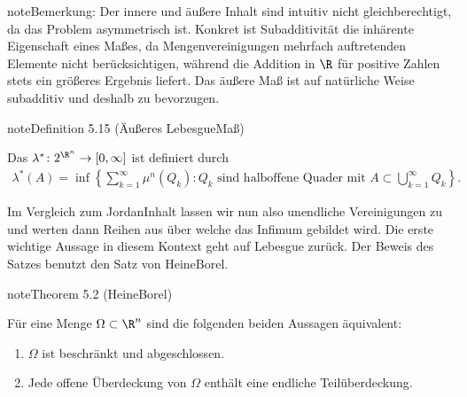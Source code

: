 \documentclass[letterpaper,10pt,german]{jupyterBook}
\begin{document}
\begin{sphinxadmonition}{note}{Bemerkung:}
\sphinxAtStartPar
Der innere und äußere Inhalt sind intuitiv nicht gleichberechtigt, da das Problem asymmetrisch ist. Konkret ist Subadditivität die inhärente Eigenschaft eines Maßes, da Mengenvereinigungen mehrfach auftretenden Elemente nicht berücksichtigen, während die Addition in \(\R\) für positive Zahlen stets ein größeres Ergebnis liefert. Das äußere Maß ist auf natürliche Weise subadditiv und deshalb zu bevorzugen.
\end{sphinxadmonition}
\label{masstheorie/masstheorie:definition-30}
\begin{sphinxadmonition}{note}{Definition 5.15 (Äußeres Lebesgue\sphinxhyphen{}Maß)}



\sphinxAtStartPar
Das  \(\lambda^* \colon 2^{\R^n} \rightarrow [0,\infty]\) ist definiert durch
\begin{equation*}
\begin{split}\lambda^*(A) = \inf \left\{ \sum_{k=1}^\infty \mu^n(Q_k) : Q_k \text{ sind halboffene Quader mit } A \subset \bigcup_{k=1}^\infty Q_k \right\}.\end{split}
\end{equation*}\end{sphinxadmonition}

\sphinxAtStartPar
Im Vergleich zum Jordan\sphinxhyphen{}Inhalt lassen wir nun also unendliche Vereinigungen zu und werten dann Reihen aus über welche das Infimum gebildet wird. Die erste wichtige Aussage in diesem Kontext geht auf Lebesgue zurück. Der Beweis des Satzes benutzt den Satz von Heine\sphinxhyphen{}Borel.
\label{masstheorie/masstheorie:thm:heineborel}
\begin{sphinxadmonition}{note}{Theorem 5.2 (Heine\sphinxhyphen{}Borel)}



\sphinxAtStartPar
Für eine Menge \(\Omega\subset\R^n\) sind die folgenden beiden Aussagen äquivalent:
\begin{enumerate}
%
\item {} 
\sphinxAtStartPar
\(\Omega\) ist beschränkt und abgeschlossen.

\item {} 
\sphinxAtStartPar
Jede offene Überdeckung von \(\Omega\) enthält eine endliche Teilüberdeckung.

\end{enumerate}
\end{sphinxadmonition}
\end{document}
